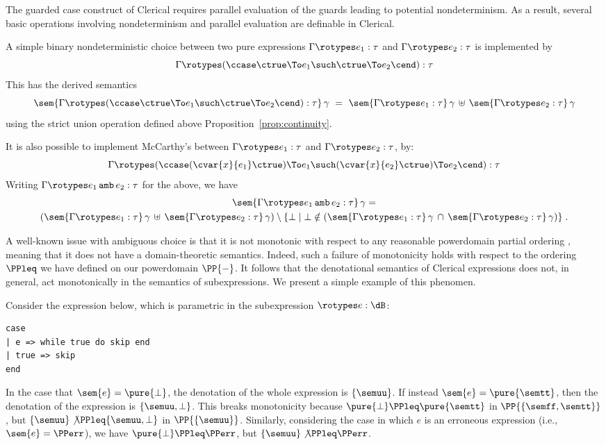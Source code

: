 The guarded case construct of Clerical requires parallel evaluation of the guards
leading to potential nondeterminism.  As a result, several basic operations involving nondeterminism and parallel evaluation are definable in Clerical.

A simple binary nondeterministic choice between two pure expressions
$\Gamma \rotypes e_1 : \tau$ and $\Gamma \rotypes e_2 : \tau$ is implemented
by
\[\Gamma \rotypes (\ccase \ctrue \To e_1 \such \ctrue \To e_2 \cend) : \tau \]
This has the derived semantics
\[
\sem{\Gamma \rotypes (\ccase \ctrue \To e_1 \such \ctrue \To e_2 \cend) : \tau }\, \gamma
~ = ~ \sem{\Gamma \rotypes e_1 : \tau } \, \gamma\,
\uplus \,
\sem{\Gamma \rotypes e_2  : \tau }\,\gamma
\]
using the strict union operation defined above Proposition~\ref{prop:continuity}.

It is also possible to implement McCarthy's  between 
$\Gamma \rotypes e_1 : \tau$ and $\Gamma \rotypes e_2 : \tau$, by:
\[\Gamma \rotypes (\ccase (\cvar{x}{e_1} \ctrue) \To e_1 \such 
(\cvar{x}{e_2} \ctrue) \To e_2 \cend) : \tau \]
Writing $\Gamma \rotypes e_1 \,\mathtt{amb}\, e_2 : \tau$ for the above, 
we have
%
\begin{multline*}
\sem{\Gamma \rotypes  e_1 \,\mathtt{amb}\, e_2 : \tau }\, \gamma = \\
  (\sem{\Gamma \rotypes e_1 : \tau } \, \gamma\, \uplus \, \sem{\Gamma \rotypes e_2  : \tau }\,\gamma)
  \setminus
  \{ \bot \mid \bot \notin (\sem{\Gamma \rotypes e_1  : \tau }\,\gamma 
\,\cap \,\sem{\Gamma \rotypes e_2  : \tau}\,\gamma)\}\;.
\end{multline*}

A well-known issue with ambiguous choice is that it is not monotonic with respect to any reasonable powerdomain partial ordering \cite{LEVY2007221}, meaning that it does not have a domain-theoretic semantics. Indeed, such a failure of monotonicity holds with respect to 
the ordering $\PPleq$ we have defined on our powerdomain $\PP{-}$. It follows that the denotational semantics of Clerical expressions does not, in general, act monotonically in the semantics of subexpressions. We present a  simple example of this phenomen.


Consider the expression below, which is parametric in the subexpression
$\rotypes e  : \dB$:
%
\begin{lstlisting}
case
| e => while true do skip end
| true => skip
end
\end{lstlisting}
%
In the case that $\sem{e} =  \pure{\bot}$, the denotation of the whole expression is $\{\semuu\} $. If instead $\sem{e} =  \pure{\semtt}$, then the denotation of the expression is $\{\semuu, \bot\}$. This breaks monotonicity because
$\pure{\bot} \PPleq  \pure{\semtt}$ in $\PP{\{\semff, \semtt\}}$, but $\{\semuu\} \not \PPleq \{\semuu, \bot\}$  in $\PP{\{\semuu\}}$.
Similarly, considering the case in which $e$ is an erroneous expression (i.e., $\sem{e} = \PPerr$),
we have $\pure{\bot} \PPleq  \PPerr$, but $\{\semuu\} \not \PPleq \PPerr$.


